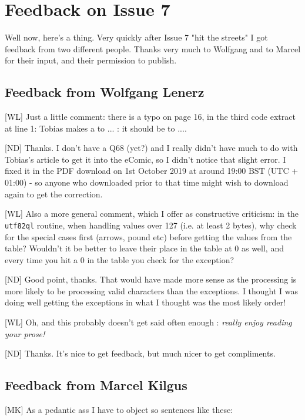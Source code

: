 \chapter{Feedback on Issue 7}

Well now, here's a thing. Very quickly after Issue 7 "hit the streets" I got feedback from two different people. Thanks very much to Wolfgang and to Marcel for their input, and their permission to publish.


\section{Feedback from Wolfgang Lenerz}

[WL] Just a little comment: there is a typo on page 16, in the third code extract at line 1: Tobias makes a  to ... : it should be to ....

[ND] Thanks. I don't have a Q68 (yet?) and I really didn't have much to do with Tobias's article to get it into the eComic, so I didn't notice that slight error. I fixed it in the PDF download on 1st October 2019 at around 19:00 BST (UTC + 01:00) - so anyone who downloaded prior to that time might wish to download again to get the correction.


[WL] Also a more general comment, which I offer as constructive criticism: in the  \texttt{utf82ql} routine, when handling values over 127 (i.e. at least 2 bytes), why check for the special cases first (arrows, pound etc) before getting the values from the table? Wouldn't it be better to leave their place in the table at 0 as well, and every time you hit a 0 in the table you check for the exception?

[ND] Good point, thanks. That would have made more sense as the processing is more likely to be processing valid characters than the exceptions. I thought I was doing well getting the exceptions in what I thought was the most likely order!


[WL] Oh, and this probably doesn't get said often enough : \emph{ really enjoy reading your prose!}

[ND] Thanks. It's nice to get feedback, but much nicer to get compliments. 



\section{Feedback from Marcel Kilgus}

[MK] As a pedantic ass I have to object so sentences like these:

